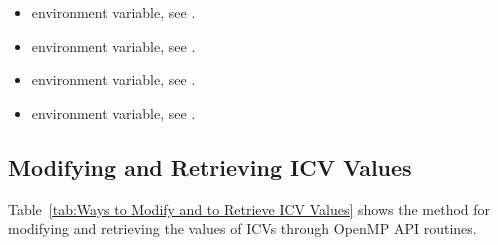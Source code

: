 \begin{itemize}
\item {} environment variable, see .

\item {} environment variable, see .

\item {} environment variable, see .

\item {} environment variable, see .
\end{itemize}



\subsection{Modifying and Retrieving ICV Values}
\label{subsec:Modifying and Retrieving ICV Values}
Table~\ref{tab:Ways to Modify and to Retrieve ICV Values} shows the method 
for modifying and retrieving the values of ICVs through OpenMP API routines.


